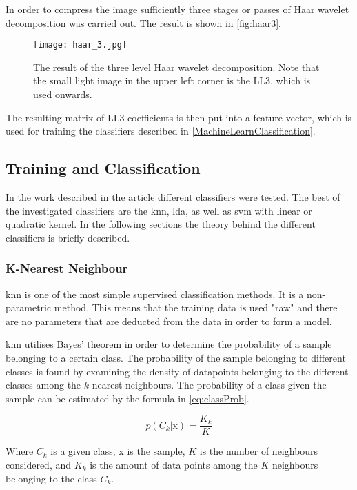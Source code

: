 In order to compress the image sufficiently three stages or passes of Haar wavelet decomposition was carried out. The result is shown in \autoref{fig:haar3}. 

\begin{figure}[H]
\centering
\texttt{[image: haar\_3.jpg]}
\caption{The result of the three level Haar wavelet decomposition. Note that the small light image in the upper left corner is the LL3, which is used onwards.}
\label{fig:haar3}
\end{figure}
The resulting matrix of LL3 coefficients is then put into a feature vector, which is used for training the classifiers described in \autoref{MachineLearnClassification}.

\subsection{Training and Classification}
\label{MachineLearnClassification}
In the work described in the article different classifiers were tested. The best of the investigated classifiers are the \gls{knn}, \gls{lda}, as well as \gls{svm} with linear or quadratic kernel. In the following sections the theory behind the different classifiers is briefly described.

\subsubsection*{K-Nearest Neighbour}
\gls{knn} is one of the most simple supervised classification methods. It is a non-parametric method. This means that the training data is used "raw" and there are no parameters that are deducted from the data in order to form a model. 
 
\gls{knn} utilises Bayes' theorem in order to determine the probability of a sample belonging to a certain class. The probability of the sample belonging to different classes is found by examining the density of datapoints belonging to the different classes among the $k$ nearest neighbours. The probability of a class given the sample can be estimated by the formula in \autoref{eq:classProb}.

 \begin{equation}\label{eq:classProb}
	p(C_k|\text{x})=\frac{K_k}{K}
\end{equation}

Where $C_k$ is a given class, $\text{x}$ is the sample, $K$ is the number of neighbours considered, and $K_k$ is the amount of data points among the $K$ neighbours belonging to the class $C_k$.


